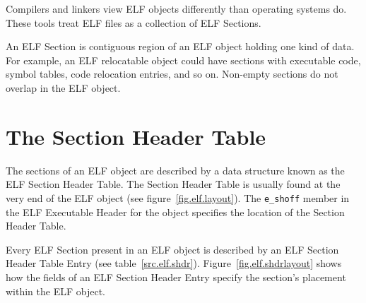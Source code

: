 \documentclass[a4paper,pdftex]{book}
\makeatletter
\newcommand{\parameter}[1]{\texttt{#1}\index{#1@\texttt{#1}}}
\newcommand{\elfdatastructure}[1]{\textsf{#1}}
\makeatother
\begin{document}
Compilers and linkers view ELF objects differently than operating
systems do. These tools treat ELF files as a collection of ELF
\elfdatastructure{Sections}.

An ELF \elfdatastructure{Section} is contiguous region
of an ELF object holding one kind of data. For example, an ELF
relocatable object could have sections with executable code, symbol
tables, code relocation entries, and so on.
Non-empty sections do not overlap in the ELF object.

\section{The Section Header Table}

The sections of an ELF object are described by a data structure known
as the ELF \elfdatastructure{Section Header Table}.  The
\elfdatastructure{Section Header Table} is usually found at
the very end of the ELF object (see figure~\vref{fig.elf.layout}).
The \parameter{e\_shoff} member in the ELF
\elfdatastructure{Executable Header} for the object specifies the
location of the \elfdatastructure{Section Header Table}.

Every ELF \elfdatastructure{Section} present in an ELF object is
described by an ELF \elfdatastructure{Section Header Table Entry} (see
table~\vref{src.elf.shdr}). Figure~\vref{fig.elf.shdrlayout} shows how
the fields of an ELF \elfdatastructure{Section Header Entry} specify
the section's placement within the ELF
object.
\end{document}

